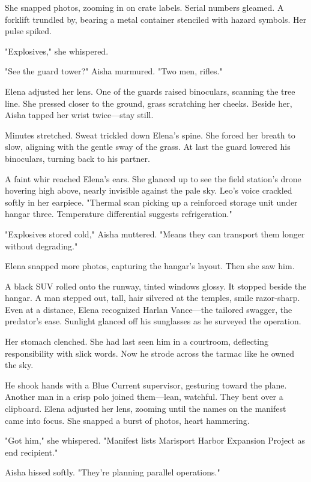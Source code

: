She snapped photos, zooming in on crate labels. Serial numbers gleamed. A forklift trundled by, bearing a metal container stenciled with hazard symbols. Her pulse spiked.

"Explosives," she whispered.

"See the guard tower?" Aisha murmured. "Two men, rifles."

Elena adjusted her lens. One of the guards raised binoculars, scanning the tree line. She pressed closer to the ground, grass scratching her cheeks. Beside her, Aisha tapped her wrist twice—stay still.

Minutes stretched. Sweat trickled down Elena's spine. She forced her breath to slow, aligning with the gentle sway of the grass. At last the guard lowered his binoculars, turning back to his partner.

A faint whir reached Elena's ears. She glanced up to see the field station's drone hovering high above, nearly invisible against the pale sky. Leo's voice crackled softly in her earpiece. "Thermal scan picking up a reinforced storage unit under hangar three. Temperature differential suggests refrigeration."

"Explosives stored cold," Aisha muttered. "Means they can transport them longer without degrading."

Elena snapped more photos, capturing the hangar's layout. Then she saw him.

A black SUV rolled onto the runway, tinted windows glossy. It stopped beside the hangar. A man stepped out, tall, hair silvered at the temples, smile razor-sharp. Even at a distance, Elena recognized Harlan Vance—the tailored swagger, the predator's ease. Sunlight glanced off his sunglasses as he surveyed the operation.

Her stomach clenched. She had last seen him in a courtroom, deflecting responsibility with slick words. Now he strode across the tarmac like he owned the sky.

He shook hands with a Blue Current supervisor, gesturing toward the plane. Another man in a crisp polo joined them—lean, watchful. They bent over a clipboard. Elena adjusted her lens, zooming until the names on the manifest came into focus. She snapped a burst of photos, heart hammering.

"Got him," she whispered. "Manifest lists Marisport Harbor Expansion Project as end recipient."

Aisha hissed softly. "They're planning parallel operations."

